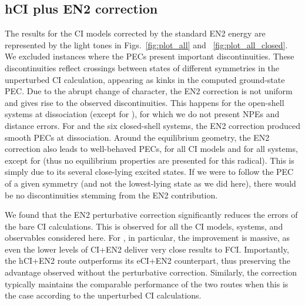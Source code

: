 \documentclass[aip,jcp,reprint,noshowkeys,superscriptaddress]{revtex4-1}
\begin{document}
\subsection{hCI plus EN2 correction}
\label{sec:res_B}

The results for the CI models corrected by the standard EN2 energy are represented by the light tones in Figs.~\ref{fig:plot_all} and ~\ref{fig:plot_all_closed}.
We excluded instances where the PECs present important discontinuities.
These discontinuities reflect crossings between states of different symmetries in the unperturbed CI calculation,
appearing as kinks in the computed ground-state PEC.
Due to the abrupt change of character, the EN2 correction is not uniform and gives rise to the observed discontinuities.
This happens for the open-shell systems at dissociation (except for ), for which we do not present NPEs and distance errors.
For  and the six closed-shell systems, the EN2 correction produced smooth PECs at dissociation.
Around the equilibrium geometry, the EN2 correction also leads to well-behaved PECs, for all CI models and for all systems, except for 
(thus no equilibrium properties are presented for this radical).
This is simply due to its several close-lying excited states.
If we were to follow the PEC of a given symmetry (and not the lowest-lying state as we did here), there would be no discontinuities stemming from the EN2 contribution.

We found that the EN2 perturbative correction significantly reduces the errors of the bare CI calculations.
This is observed for all the CI models, systems, and observables considered here.
For , in particular, the improvement is massive, as even the lower levels of CI+EN2 deliver very close results to FCI.
Importantly, the hCI+EN2 route outperforms its eCI+EN2 counterpart, thus preserving the advantage observed without the perturbative correction.
Similarly, the correction typically maintains the comparable performance of the two routes when this is the case according to the unperturbed CI calculations.
\end{document}
